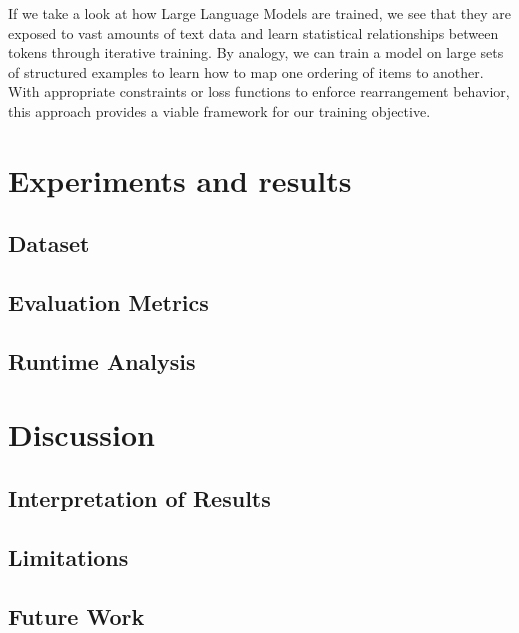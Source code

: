 \documentclass[12pt,a4paper]{report}
\begin{document}
If we take a look at how Large Language Models are trained, we see that they are exposed to vast amounts of text data and learn statistical relationships between tokens through iterative training. By analogy, we can train a model on large sets of structured examples to learn how to map one ordering of items to another. With appropriate constraints or loss functions to enforce rearrangement behavior, this approach provides a viable framework for our training objective.


\chapter{Experiments and results}
\section{Dataset}
\section{Evaluation Metrics}
\section{Runtime Analysis}

\chapter{Discussion}
\section{Interpretation of Results}
\section{Limitations}
\section{Future Work}
\end{document}

